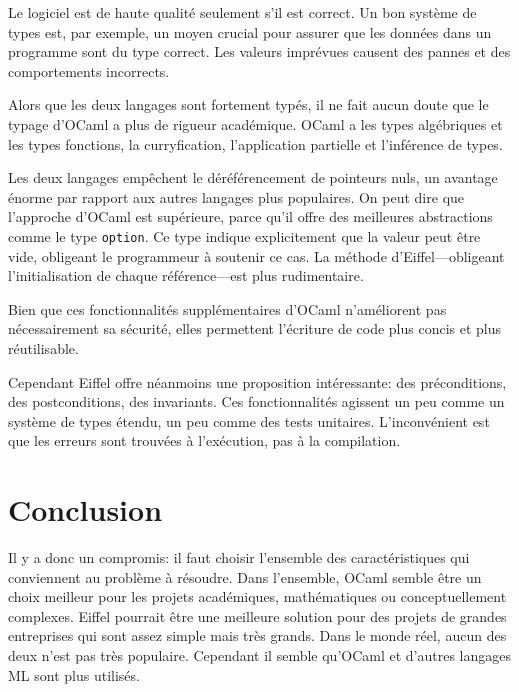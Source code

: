 \documentclass[french]{report}
\begin{document}
Le logiciel est de haute qualité seulement s'il est correct. Un bon système de types est, par exemple, un moyen crucial pour assurer que les données dans un programme sont du type correct. Les valeurs imprévues causent des pannes et des comportements incorrects.

Alors que les deux langages sont fortement typés, il ne fait aucun doute que le typage d'OCaml a plus de rigueur académique. OCaml a les types algébriques et les types \glspl{fonction}, la curryfication, l'application partielle et l'inférence de types.

Les deux langages empêchent le déréférencement de pointeurs nuls, un avantage énorme par rapport aux autres langages plus populaires. On peut dire que l'approche d'OCaml est supérieure, parce qu'il offre des meilleures abstractions comme le type \texttt{option}. Ce type indique explicitement que la valeur peut être vide, obligeant le programmeur à soutenir ce cas. La méthode d'Eiffel---obligeant l'initialisation de chaque référence---est plus rudimentaire.

Bien que ces fonctionnalités supplémentaires d'OCaml n'améliorent pas nécessairement sa sécurité, elles permettent l'écriture de code plus concis et plus réutilisable.

Cependant Eiffel offre néanmoins une proposition intéressante: des préconditions, des postconditions, des invariants. Ces fonctionnalités agissent un peu comme un système de types étendu, un peu comme des tests unitaires. L'inconvénient est que les erreurs sont trouvées à l'exécution, pas à la compilation.

\chapter{Conclusion}

Il y a donc un compromis: il faut choisir l'ensemble des caractéristiques qui conviennent au problème à résoudre. Dans l'ensemble, OCaml semble être un choix meilleur pour les projets académiques, mathématiques ou conceptuellement complexes. Eiffel pourrait être une meilleure solution pour des projets de grandes entreprises qui sont assez simple mais très grands. Dans le monde réel, aucun des deux n'est pas très populaire. Cependant il semble qu'OCaml et d'autres langages ML sont plus utilisés\cite{tiobe}.
\end{document}
